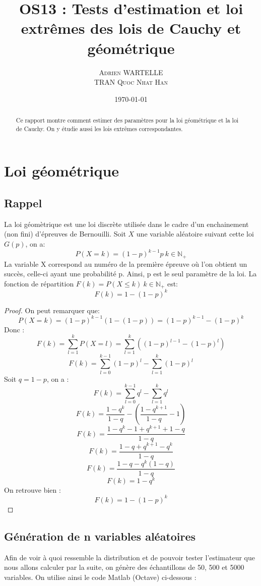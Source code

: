 \documentclass[12pt,a4paper,titlepage]{article}
\title{OS13 : Tests d'estimation et loi extrêmes des lois de Cauchy et géométrique}
\author{\textsc{Adrien WARTELLE} \\ \textsc{TRAN Quoc Nhat Han}}
\date{\today}
\numberwithin{equation}{section}
\begin{document}
\maketitle 
\renewcommand{\contentsname}{Sommaire}
\tableofcontents

\clearpage

\begin{abstract}
Ce rapport montre comment estimer des paramètres pour la loi géométrique et la loi de Cauchy.
On y étudie aussi les lois extrêmes correspondantes.
\end{abstract}

\section{Loi géométrique}

\subsection{Rappel}

La loi géomètrique est une loi discrète utilisée
dans le cadre d'un enchainement (non fini) d'épreuves de Bernouilli. Soit
$X$ une variable aléatoire suivant cette loi $G(p)$, on a:
\[P(X=k) = (1-p)^{k-1}p\ k\in\mathbb{N}_{+}\]
La variable X correspond au numéro de la première épreuve où l'on obtient un succès, celle-ci ayant une probabilité p. Ainsi, p est le seul paramètre de la loi.
La fonction de répartition $F(k) = P(X\leq{}k)\ k\in\mathbb{N}_{+}$ est:
\[F(k)=1-(1-p)^{k}\]
\begin{proof}
On peut remarquer que:
\[P(X=k)=(1-p)^{k-1}(1-(1-p))=(1-p)^{k-1}-(1-p)^{k}\]
Donc :
\[F(k)=\sum\limits_{l=1}^{k}P(X=l)=\sum\limits_{l=1}^{k}((1-p)^{l-1}-(1-p)^{l})\]
\[F(k)=\sum\limits_{l=0}^{k-1}(1-p)^{l}-\sum\limits_{l=1}^{k}(1-p)^{l}\]
Soit $q=1-p$, on a :
\[F(k)=\sum\limits_{l=0}^{k-1}q^{l}-\sum\limits_{l=1}^{k}q^{l}\]
\[F(k)=\frac{1-q^k}{1-q}-(\frac{1-q^{k+1}}{1-q}-1)\]
\[F(k)=\frac{1-q^k-1+q^{k+1}+1-q}{1-q}\]
\[F(k)=\frac{1-q+q^{k+1}-q^k}{1-q}\]
\[F(k)=\frac{1-q-q^k(1-q)}{1-q}\]
\[F(k)=1-q^k\]
On retrouve bien :
\[F(k)=1-(1-p)^k\]
\end{proof}

\subsection{Génération de n variables aléatoires}

Afin de voir à quoi ressemble la distribution et de pouvoir tester l'estimateur que
nous allons calculer par la suite, on génère des échantillons de 50, 500 et 5000 variables.
On utilise ainsi le code Matlab (Octave) ci-dessous :
\end{document}
